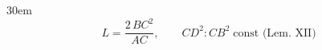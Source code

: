 \documentclass[border=4pt]{standalone}
\begin{document}
\begin{varwidth}{30em}
\large
\[ L = \dfrac{2\,BC^2}{AC}, \qquad CD^2 : CB^2 \;\text{const (Lem. XII)} \]

\end{varwidth}
\end{document}

